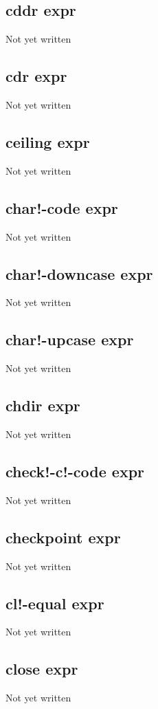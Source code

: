 \documentclass[a4paper,11pt]{article}
\begin{document}
{\subsection{\ttfamily cddr expr}
   Not yet written

\subsection{\ttfamily cdr expr}
   Not yet written

\subsection{\ttfamily ceiling expr}
   Not yet written

\subsection{\ttfamily char!-code expr}
   Not yet written

\subsection{\ttfamily char!-downcase expr}
   Not yet written

\subsection{\ttfamily char!-upcase expr}
   Not yet written

\subsection{\ttfamily chdir expr}
   Not yet written

\subsection{\ttfamily check!-c!-code expr}
   Not yet written

\subsection{\ttfamily checkpoint expr}
   Not yet written

\subsection{\ttfamily cl!-equal expr}
   Not yet written

\subsection{\ttfamily close expr}
   Not yet written

}
\end{document}
